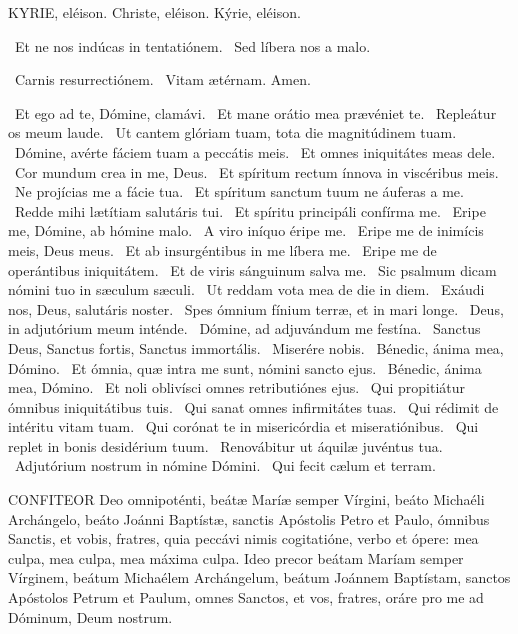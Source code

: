 

KYRIE, eléison. Christe, eléison. Kýrie, eléison.

 \V\ Et ne nos indúcas in tentatiónem. \R\ Sed líbera nos a malo.

 \V\ Carnis resurrectiónem. \R\ Vitam ætérnam. Amen.

\V\ Et ego ad te, Dómine, clamávi. \R\ Et mane orátio mea prævéniet te. \V\ Repleátur os meum laude. \R\ Ut cantem glóriam tuam, tota die magnitúdinem tuam. \V\ Dómine, avérte fáciem tuam a peccátis meis. \R\ Et omnes iniquitátes meas dele. \V\ Cor mundum crea in me, Deus. \R\ Et spíritum rectum ínnova in viscéribus meis. \V\ Ne projícias me a fácie tua. \R\ Et spíritum sanctum tuum ne áuferas a me. \V\ Redde mihi lætítiam salutáris tui. \R\ Et spíritu principáli confírma me. \V\ Eripe me, Dómine, ab hómine malo. \R\ A viro iníquo éripe me. \V\ Eripe me de inimícis meis, Deus meus. \R\ Et ab insurgéntibus in me líbera me. \V\ Eripe me de operántibus iniquitátem. \R\ Et de viris sánguinum salva me. \V\ Sic psalmum dicam nómini tuo in sæculum sæculi. \R\ Ut reddam vota mea de die in diem. \V\ Exáudi nos, Deus, salutáris noster. \R\ Spes ómnium fínium terræ, et in mari longe. \V\ Deus, in adjutórium meum inténde. \R\ Dómine, ad adjuvándum me festína. \V\ Sanctus Deus, Sanctus fortis, Sanctus immortális. \R\ Miserére nobis. \V\ Bénedic, ánima mea, Dómino. \R\ Et ómnia, quæ intra me sunt, nómini sancto ejus. \V\ Bénedic, ánima mea, Dómino. \R\ Et noli oblivísci omnes retributiónes ejus. \V\ Qui propitiátur ómnibus iniquitátibus tuis. \R\ Qui sanat omnes infirmitátes tuas. \V\ Qui rédimit de intéritu vitam tuam. \R\ Qui corónat te in misericórdia et miseratiónibus. \V\ Qui replet in bonis desidérium tuum. \R\ Renovábitur ut áquilæ juvéntus tua. \V\ Adjutórium nostrum in nómine Dómini. \R\ Qui fecit cælum et terram.


\lettrine[lines=2]{C}{ONFITEOR} Deo omnipoténti, beátæ Maríæ semper Vírgini, beáto Michaéli Archángelo, beáto Joánni Baptístæ, sanctis Apóstolis Petro et Paulo, ómnibus Sanctis, et vobis, fratres, quia peccávi nimis cogitatióne, verbo et ópere: mea culpa, mea culpa, mea máxima culpa. Ideo precor beátam Maríam semper Vírginem, beátum Michaélem Archángelum, beátum Joánnem Baptístam, sanctos Apóstolos Petrum et Paulum, omnes Sanctos, et vos, fratres, oráre pro me ad Dóminum, Deum nostrum.


